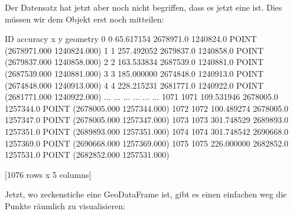 \documentclass[letterpaper,10pt,english]{sphinxmanual}
\begin{document}
\begin{sphinxVerbatim}[commandchars=\\\{\}]
\PYG{p}{[}\PYG{p}{]}   
\end{sphinxVerbatim}

Der Datensatz  hat jetzt aber noch nicht begriffen, dass es jetzt eine  ist. Dies müssen wir dem Objekt erst noch mitteilen:

\begin{sphinxVerbatim}[commandchars=\\\{\}]
  

\end{sphinxVerbatim}

\begin{sphinxVerbatim}[commandchars=\\\{\}]
        ID    accuracy          x          y                         geometry
0        0   65.617154  2678971.0  1240824.0  POINT (2678971.000 1240824.000)
1        1  257.492052  2679837.0  1240858.0  POINT (2679837.000 1240858.000)
2        2  163.533834  2687539.0  1240881.0  POINT (2687539.000 1240881.000)
3        3  185.000000  2674848.0  1240913.0  POINT (2674848.000 1240913.000)
4        4  228.215231  2681771.0  1240922.0  POINT (2681771.000 1240922.000)
...    ...         ...        ...        ...                              ...
1071  1071  109.531946  2678005.0  1257344.0  POINT (2678005.000 1257344.000)
1072  1072  100.489274  2678005.0  1257347.0  POINT (2678005.000 1257347.000)
1073  1073  301.748529  2689893.0  1257351.0  POINT (2689893.000 1257351.000)
1074  1074  301.748542  2690668.0  1257369.0  POINT (2690668.000 1257369.000)
1075  1075  226.000000  2682852.0  1257531.0  POINT (2682852.000 1257531.000)

[1076 rows x 5 columns]
\end{sphinxVerbatim}

Jetzt, wo zeckenstiche eine GeoDataFrame ist, gibt es einen einfachen weg die Punkte räumlich zu visualisieren:

\begin{sphinxVerbatim}[commandchars=\\\{\}]
\end{sphinxVerbatim}
\end{document}
